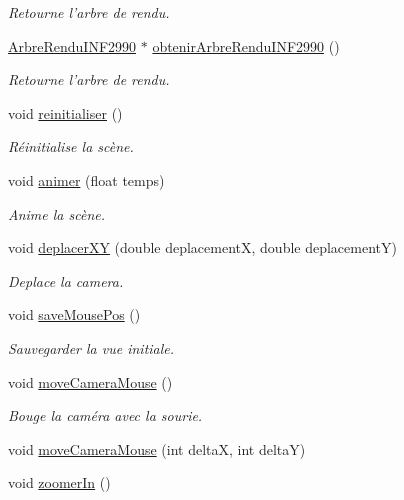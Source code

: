 \begin{DoxyCompactItemize}
\begin{DoxyCompactList}\small\item\em Retourne l'arbre de rendu. \end{DoxyCompactList}\item 
\hyperlink{class_arbre_rendu_i_n_f2990}{Arbre\-Rendu\-I\-N\-F2990} $\ast$ \hyperlink{group__inf2990_ga12d5594db6a9507b24c7e1ffcd6751af}{obtenir\-Arbre\-Rendu\-I\-N\-F2990} ()
\begin{DoxyCompactList}\small\item\em Retourne l'arbre de rendu. \end{DoxyCompactList}\item 
void \hyperlink{group__inf2990_ga4c2a991fe2297e44eeee0de111fb08d2}{reinitialiser} ()
\begin{DoxyCompactList}\small\item\em Réinitialise la scène. \end{DoxyCompactList}\item 
void \hyperlink{group__inf2990_ga24dcb4e32cf104797158b398bafbfbb7}{animer} (float temps)
\begin{DoxyCompactList}\small\item\em Anime la scène. \end{DoxyCompactList}\item 
void \hyperlink{group__inf2990_ga1d0468d14d18990c39861b22d4921a7c}{deplacer\-X\-Y} (double deplacement\-X, double deplacement\-Y)
\begin{DoxyCompactList}\small\item\em Deplace la camera. \end{DoxyCompactList}\item 
void \hyperlink{group__inf2990_gafd140af6e52aa738d9f301d4d5ea6530}{save\-Mouse\-Pos} ()
\begin{DoxyCompactList}\small\item\em Sauvegarder la vue initiale. \end{DoxyCompactList}\item 
void \hyperlink{group__inf2990_gaba7107809948a77f8ef3bf2240bc2bc4}{move\-Camera\-Mouse} ()
\begin{DoxyCompactList}\small\item\em Bouge la caméra avec la sourie. \end{DoxyCompactList}\item 
void \hyperlink{group__inf2990_ga2cab5c7a210e76f1c4f69d6ce2cb6403}{move\-Camera\-Mouse} (int delta\-X, int delta\-Y)
\item 
void \hyperlink{group__inf2990_ga8f027fa8ccba48bada7b91b1bc32ed96}{zoomer\-In} ()

\end{DoxyCompactItemize}
